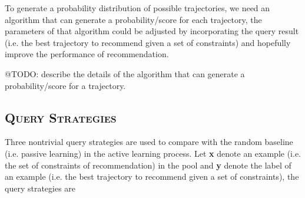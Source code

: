 \documentclass[11pt, a4paper]{article}
\begin{document}
To generate a probability distribution of possible trajectories, 
we need an algorithm that can generate a probability/score for each trajectory,
the parameters of that algorithm could be adjusted by incorporating the query result 
(i.e. the best trajectory to recommend given a set of constraints) and 
hopefully improve the performance of recommendation.

@TODO: describe the details of the algorithm that can generate a probability/score for a trajectory.

\subsection{\textsc{Query Strategies}}
Three nontrivial query strategies are used to compare with the random baseline (i.e. passive learning) in the active learning process.
Let \textbf{x} denote an example (i.e. the set of constraints of recommendation) in the pool and 
\textbf{y} denote the label of an example (i.e. the best trajectory to recommend given a set of constraints),
the query strategies are
\end{document}
